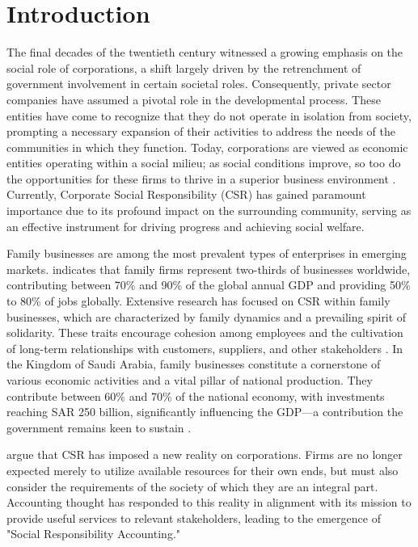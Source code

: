 \documentclass[10pt]{NSP1}
\begin{document}
	\maketitle
	
	\section{Introduction}
	
	The final decades of the twentieth century witnessed a growing emphasis on the social role of corporations, a shift largely driven by the retrenchment of government involvement in certain societal roles. Consequently, private sector companies have assumed a pivotal role in the developmental process. These entities have come to recognize that they do not operate in isolation from society, prompting a necessary expansion of their activities to address the needs of the communities in which they function. Today, corporations are viewed as economic entities operating within a social milieu; as social conditions improve, so too do the opportunities for these firms to thrive in a superior business environment \cite{AbdelHalim2018}. Currently, Corporate Social Responsibility (CSR) has gained paramount importance due to its profound impact on the surrounding community, serving as an effective instrument for driving progress and achieving social welfare.
	
	Family businesses are among the most prevalent types of enterprises in emerging markets. \cite{Qarsham2023} indicates that family firms represent two-thirds of businesses worldwide, contributing between 70\% and 90\% of the global annual GDP and providing 50\% to 80\% of jobs globally. Extensive research has focused on CSR within family businesses, which are characterized by family dynamics and a prevailing spirit of solidarity. These traits encourage cohesion among employees and the cultivation of long-term relationships with customers, suppliers, and other stakeholders \cite{Ali2023}. In the Kingdom of Saudi Arabia, family businesses constitute a cornerstone of various economic activities and a vital pillar of national production. They contribute between 60\% and 70\% of the national economy, with investments reaching SAR 250 billion, significantly influencing the GDP—a contribution the government remains keen to sustain \cite{AlMuqaddam2024}.
	
	\cite{AbdelSalam2018} argue that CSR has imposed a new reality on corporations. Firms are no longer expected merely to utilize available resources for their own ends, but must also consider the requirements of the society of which they are an integral part. Accounting thought has responded to this reality in alignment with its mission to provide useful services to relevant stakeholders, leading to the emergence of "Social Responsibility Accounting."
	
\end{document}
